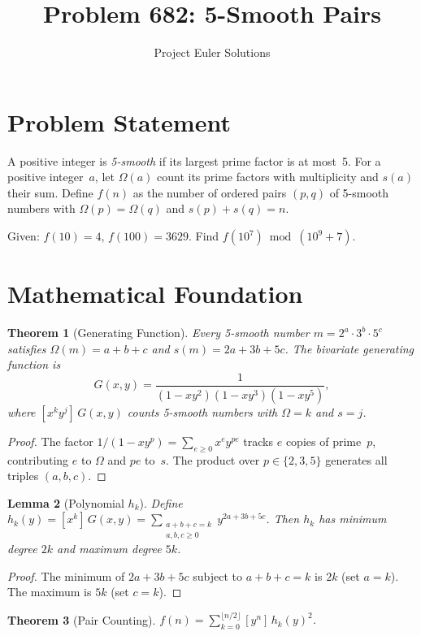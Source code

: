 \documentclass[11pt]{article}
\title{Problem 682: 5-Smooth Pairs}
\author{Project Euler Solutions}
\date{}
\newtheorem{theorem}{Theorem}
\newtheorem{lemma}[theorem]{Lemma}
\begin{document}
\maketitle

\section{Problem Statement}

A positive integer is \emph{5-smooth} if its largest prime factor is at most~5. For a positive integer~$a$, let $\Omega(a)$ count its prime factors with multiplicity and $s(a)$ their sum. Define $f(n)$ as the number of ordered pairs $(p,q)$ of 5-smooth numbers with $\Omega(p)=\Omega(q)$ and $s(p)+s(q)=n$.

Given: $f(10)=4$, $f(100)=3629$. Find $f(10^7)\bmod(10^9+7)$.

\section{Mathematical Foundation}

\begin{theorem}[Generating Function]
Every 5-smooth number $m = 2^a\cdot 3^b\cdot 5^c$ satisfies $\Omega(m)=a+b+c$ and $s(m)=2a+3b+5c$. The bivariate generating function is
\[
G(x,y) = \frac{1}{(1-xy^2)(1-xy^3)(1-xy^5)},
\]
where $[x^k y^j]\,G(x,y)$ counts 5-smooth numbers with $\Omega=k$ and $s=j$.
\end{theorem}

\begin{proof}
The factor $1/(1-xy^p)=\sum_{e\ge 0}x^e y^{pe}$ tracks $e$ copies of prime~$p$, contributing $e$ to $\Omega$ and $pe$ to~$s$. The product over $p\in\{2,3,5\}$ generates all triples $(a,b,c)$.
\end{proof}

\begin{lemma}[Polynomial $h_k$]
Define $h_k(y) = [x^k]\,G(x,y) = \sum_{\substack{a+b+c=k\\a,b,c\ge 0}} y^{2a+3b+5c}$. Then $h_k$ has minimum degree $2k$ and maximum degree $5k$.
\end{lemma}

\begin{proof}
The minimum of $2a+3b+5c$ subject to $a+b+c=k$ is $2k$ (set $a=k$). The maximum is $5k$ (set $c=k$).
\end{proof}

\begin{theorem}[Pair Counting]
$\displaystyle f(n) = \sum_{k=0}^{\lfloor n/2\rfloor} [y^n]\,h_k(y)^2$.
\end{theorem}
\end{document}
